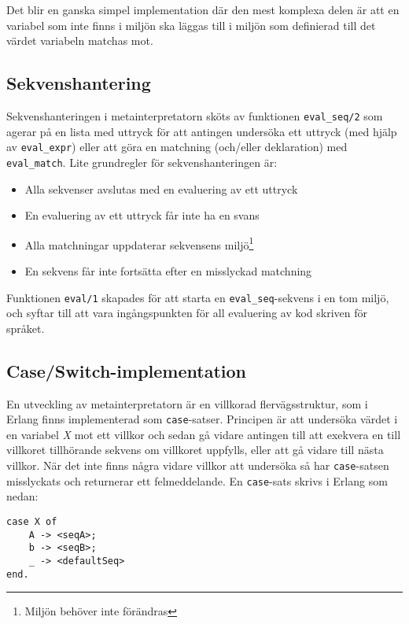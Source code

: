 \documentclass[a4paper, 11pt]{article}
\begin{document}
Det blir en ganska simpel implementation där den mest komplexa delen är att en variabel som inte finns i miljön ska läggas till i miljön som definierad till det värdet variabeln matchas mot.

\subsection{Sekvenshantering}
Sekvenshanteringen i metainterpretatorn sköts av funktionen \texttt{eval_seq/2} som agerar på en lista med uttryck för att antingen undersöka ett uttryck (med hjälp av \texttt{eval_expr}) eller att göra en matchning (och/eller deklaration) med \texttt{eval_match}. Lite grundregler för sekvenshanteringen är:

\begin{itemize}
\item Alla sekvenser avslutas med en evaluering av ett uttryck
\item En evaluering av ett uttryck får inte ha en svans
\item Alla matchningar uppdaterar sekvensens miljö\footnote{Miljön behöver inte förändras}
\item En sekvens får inte fortsätta efter en misslyckad matchning
\end{itemize}

Funktionen \texttt{eval/1} skapades för att starta en \texttt{eval_seq}-sekvens i en tom miljö, och syftar till att vara ingångspunkten för all evaluering av kod skriven för språket.

\subsection{Case/Switch-implementation}
\label{subsec:caseswitch}
En utveckling av metainterpretatorn är en villkorad flervägsstruktur, som i Erlang finns implementerad som \texttt{case}-satser. Principen är att under\-söka värdet i en variabel \textit{X} mot ett villkor och sedan gå vidare antingen till att exekvera en till villkoret tillhörande sekvens om villkoret uppfylls, eller att gå vidare till nästa villkor. När det inte finns några vidare villkor att undersöka så har \texttt{case}-satsen misslyckats och returnerar ett fel\-meddel\-ande. En \texttt{case}-sats skrivs i Erlang som nedan:

\begin{lstlisting}[caption={\texttt{case}-sats i Erlang},label=lst:case]
case X of
	A -> <seqA>;
	b -> <seqB>;
	_ -> <defaultSeq>
end.
\end{lstlisting}
\end{document}
